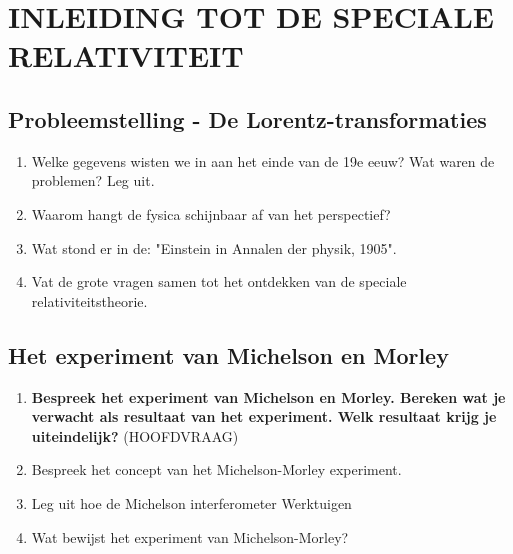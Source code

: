 \documentclass[12pt]{article}
\begin{document}
    \maketitle

    \section{INLEIDING TOT DE SPECIALE RELATIVITEIT}
    \subsection{Probleemstelling - De Lorentz-transformaties}
    \begin{enumerate}
        \item Welke gegevens wisten we in aan het einde van de 19e eeuw? Wat waren de problemen? Leg uit.
        \item Waarom hangt de fysica schijnbaar af van het perspectief?
        \item Wat stond er in de: "Einstein in Annalen der physik, 1905".
        \item Vat de grote vragen samen tot het ontdekken van de speciale relativiteitstheorie.
    \end{enumerate}
    \subsection{Het experiment van Michelson en Morley}
    \begin{enumerate}
        \item \textbf{Bespreek het experiment van Michelson en Morley. Bereken wat je verwacht als resultaat van het experiment. Welk resultaat krijg je uiteindelijk?} (HOOFDVRAAG)
        \item Bespreek het concept van het Michelson-Morley experiment.
        \item Leg uit hoe de Michelson interferometer Werktuigen
        \item Wat bewijst het experiment van Michelson-Morley?
    \end{enumerate}
\end{document}
